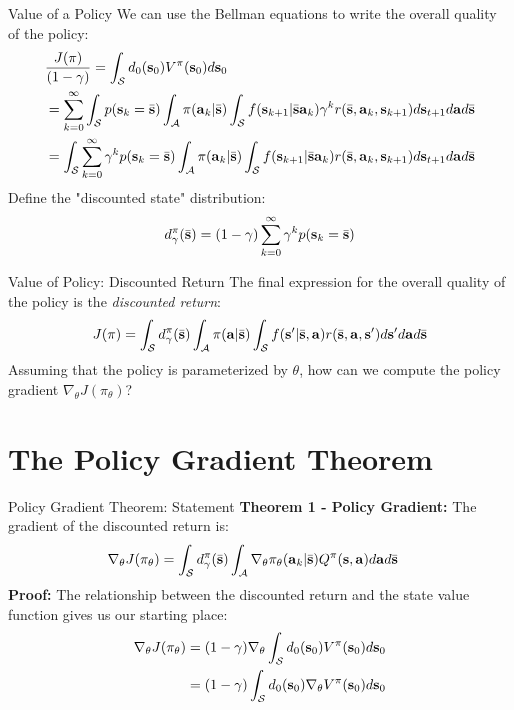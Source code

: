 \documentclass[]{beamer}
\begin{document}
\begin{frame}{Value of a Policy}
    We can use the Bellman equations to write the overall quality of the policy:
    {\small
    \begin{align*}
        &\frac{J(\pi)}{(1-\gamma)} = \int_\cS d_0(\vs_0) V^\pi(\vs_0) d\vs_0\\
        &= \sum_{k=0}^\infty \int_\cS p(\vs_k = \bar \vs) \int_\cA \pi(\va_k | \bar \vs) \int_\cS f(\vs_{k+1} | \bar \vs \va_k) \gamma^k r(\bar \vs, \va_k, \vs_{k+1}) d\vs_{t+1} d\va d \bar \vs \\
        &= \int_\cS \sum_{k=0}^\infty \gamma^k p(\vs_k = \bar \vs) \int_\cA \pi(\va_k | \bar \vs) \int_\cS f(\vs_{k+1} | \bar \vs \va_k) r(\bar \vs, \va_k, \vs_{k+1}) d\vs_{t+1} d\va d\bar\vs
    \end{align*}
    }
    Define the "discounted state" distribution:
    \[ d^\pi_\gamma(\bar \vs) = (1-\gamma)\sum_{k=0}^\infty \gamma^k p(\vs_k = \bar \vs) \]

\end{frame}

\begin{frame}{Value of Policy: Discounted Return}
    The final expression for the overall quality of the policy is the \textit{discounted return}:
    \begin{align*}
        J(\pi) = \int_\cS d^\pi_\gamma(\bar \vs) \int_\cA \pi(\va | \bar \vs) \int_\cS f(\vs' | \bar \vs, \va) r(\bar \vs, \va, \vs') d\vs' d\va d\bar\vs
    \end{align*}
    Assuming that the policy is parameterized by $\theta$, how can we compute the policy gradient $\nabla_\theta J(\pi_\theta)$? \\
\end{frame}

\section{The Policy Gradient Theorem}

\begin{frame}{Policy Gradient Theorem: Statement}
\textbf{Theorem 1 - Policy Gradient:} \cite{sutton2000policy} The gradient of the discounted return is:
\begin{align*}
    \nabla_\theta J(\pi_\theta) &= \int_\cS d^\pi_\gamma(\bar \vs) \int_\cA \nabla_\theta \pi_\theta(\va_k | \bar \vs) Q^\pi(\vs, \va) d\va d\bar\vs
\end{align*}
\textbf{Proof:} The relationship between the discounted return and the state value function gives us our starting place:
\begin{align*}
    \nabla_\theta J(\pi_\theta) &= (1-\gamma) \nabla_\theta \int_\cS d_0(\vs_0) V^\pi(\vs_0) d\vs_0\\
    &= (1-\gamma) \int_\cS d_0(\vs_0) \nabla_\theta V^\pi(\vs_0) d\vs_0\\
\end{align*}

\end{frame}
\end{document}

